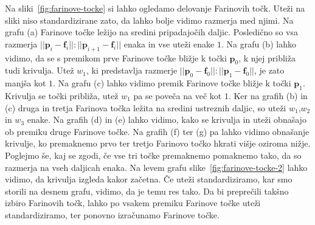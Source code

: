 \documentclass[isrm2, tisk]{fmfdelo}
\newcommand{\p}{\mathbf{p}}
\begin{document}
    Na sliki~\ref{fig:farinove-tocke} si lahko ogledamo delovanje Farinovih točk.
    Uteži na sliki niso standardizirane zato, da lahko bolje vidimo razmerja med njimi.
    Na grafu (a) Farinove točke ležijo na sredini pripadajočih daljic.
    Posledično so vsa razmerja $||\p_i-\mathbf{f}_i||:||\p_{i+1}-\mathbf{f}_i||$ enaka in vse uteži enake $1$.
    Na grafu (b) lahko vidimo, da se s premikom prve Farinove točke bližje k točki $\p_0$, k njej približa tudi krivulja.
    Utež $w_1$, ki predstavlja razmerje $||\p_0-\mathbf{f}_0||:||\p_{1}-\mathbf{f}_0||$, je zato manjša kot $1$.
    Na grafu (c) lahko vidimo premik Farinove točke bližje k točki $\p_1$.
    Krivulja se točki približa, utež $w_1$ pa se poveča na več kot $1$.
    Ker na grafih (b) in (c) druga in tretja Farinova točka ležita na sredini ustreznih daljic, so uteži $w_1$,$w_2$ in $w_3$ enake.
    Na grafih (d) in (e) lahko vidimo, kako se krivulja in uteži obnašajo ob premiku druge Farinove točke.
    Na grafih (f) ter (g) pa lahko vidimo obnašanje krivulje, ko premaknemo prvo ter tretjo Farinovo točko hkrati višje oziroma nižje.
    Poglejmo še, kaj se zgodi, če vse tri točke premaknemo pomaknemo tako, da so razmerja na vseh daljicah enaka.
    Na levem grafu slike~\ref{fig:farinove-tocke-2} lahko vidimo, da krivulja izgleda kakor začetna.
    Če uteži standardiziramo, kar smo storili na desnem grafu, vidimo, da je temu res tako.
    Da bi preprečili takšno izbiro Farinovih točk, lahko po vsakem premiku Farinove točke uteži standardiziramo, ter ponovno izračunamo Farinove točke.
\end{document}
